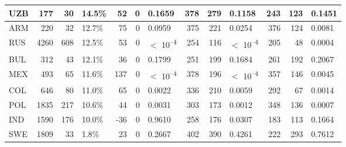 \begin{tabular}{l|r|r|l|r|r|l|r|r|l|r|r|l}
\hline
UZB & 177 & 30 & 14.5\% & 52 & 0 & 0.1659 & 378 & 279 & 0.1158 & 243 & 123 & 0.1451\\
\hline
ARM & 220 & 32 & 12.7\% & 75 & 0 & 0.0959 & 375 & 221 & 0.0254 & 376 & 124 & 0.0081\\
\hline
RUS & 4260 & 608 & 12.5\% & 53 & 0 & $<$ 10\textsuperscript{--4} & 254 & 116 & $<$ 10\textsuperscript{--4} & 205 & 48 & 0.0004\\
\hline
BUL & 312 & 43 & 12.1\% & 36 & 0 & 0.1799 & 251 & 199 & 0.1684 & 261 & 192 & 0.2067\\
\hline
MEX & 493 & 65 & 11.6\% & 137 & 0 & $<$ 10\textsuperscript{--4} & 378 & 196 & $<$ 10\textsuperscript{--4} & 357 & 146 & 0.0045\\
\hline
COL & 646 & 80 & 11.0\% & 65 & 0 & 0.0022 & 336 & 210 & 0.0059 & 292 & 67 & 0.0014\\
\hline
POL & 1835 & 217 & 10.6\% & 44 & 0 & 0.0031 & 303 & 173 & 0.0012 & 348 & 136 & 0.0007\\
\hline
IND & 1590 & 176 & 10.0\% & -36 & 0 & 0.9610 & 258 & 176 & 0.0307 & 183 & 113 & 0.1664\\
\hline
SWE & 1809 & 33 & 1.8\% & 23 & 0 & 0.2667 & 402 & 390 & 0.4261 & 222 & 293 & 0.7612\\
\hline
\end{tabular}
